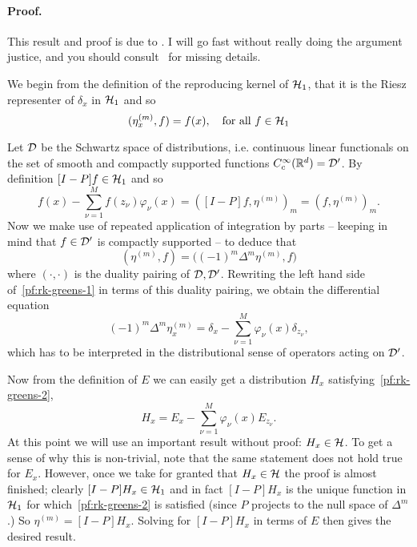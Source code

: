 \documentclass{article}
\begin{document}
\paragraph{Proof.}
This result and proof is due to \citet{meinguet1979}. I will go fast without really doing the argument justice, and you should consult~\citet{meinguet1979} for missing details.

We begin from the definition of the reproducing kernel of $\mathcal{H}_1$, that it is the Riesz representer of $\delta_x$ in $\mathcal{H}_1$ and so
\begin{equation*}
	(\eta_x^{(m)},f) = f(x), \quad \textrm{for all $f \in \mathcal{H}_1$}
\end{equation*}

Let $\mathcal{D}$ be the Schwartz space of distributions, i.e. continuous linear functionals on the set of smooth and compactly supported functions $C_c^{\infty}(\mathbb{R}^d) = \mathcal{D}'$. By definition $[I - P]f \in \mathcal{H}_1$ and so
\begin{equation}
	\label{pf:rk-greens-1}
	f(x) - \sum_{\nu = 1}^{M} f(z_{\nu}) \varphi_{\nu}(x) = ([I - P]f, \eta^{(m)})_m = (f,\eta^{(m)})_m.
\end{equation}
Now we make use of repeated application of integration by parts -- keeping in mind that $f \in \mathcal{D}'$ is compactly supported -- to deduce that
\begin{equation*}
	(\eta^{(m)},f) = \bigl((-1)^m \Delta^m \eta^{(m)},f\bigr)
\end{equation*}
where $(\cdot,\cdot)$ is the duality pairing of $\mathcal{D},\mathcal{D}'$. Rewriting the left hand side of~\eqref{pf:rk-greens-1} in terms of this duality pairing, we obtain the differential equation
\begin{equation}
	\label{pf:rk-greens-2}
	(-1)^m \Delta^m \eta_x^{(m)} = \delta_{x} - \sum_{\nu = 1}^{M} \varphi_{\nu}(x) \delta_{z_\nu},
\end{equation}
which has to be interpreted in the distributional sense of operators acting on $\mathcal{D}'$.

Now from the definition of $E$ we can easily get a distribution $H_x$ satisfying~\eqref{pf:rk-greens-2},
\begin{equation*}
	H_x = E_x - \sum_{\nu = 1}^{M} \varphi_{\nu}(x) E_{z_{\nu}}.
\end{equation*}
At this point we will use an important result without proof: $H_x \in \mathcal{H}$. To get a sense of why this is non-trivial, note that the same statement does not hold true for $E_x$. However, once we take for granted that $H_x \in \mathcal{H}$ the proof is almost finished; clearly $[I - P]H_x \in \mathcal{H}_1$ and in fact $[I - P]H_x$ is the unique function in $\mathcal{H}_1$ for which~\eqref{pf:rk-greens-2} is satisfied (since $P$ projects to the null space of $\Delta^m$.) So $\eta^{(m)} = [I - P]H_x$. Solving for $[I - P]H_x$ in terms of $E$ then gives the desired result.
\end{document}

